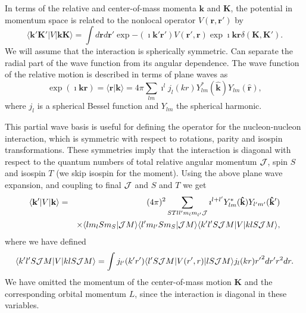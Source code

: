 \documentclass[graybox,sectrefs,envcountresetchap,open=right]{svmonodo}
\begin{document}
In terms of the relative and center-of-mass momenta $\mathbf{k}$ and
$\mathbf{K}$, the potential in momentum space is related to the nonlocal operator
$V(\mathbf{r},\mathbf{r}')$ by
\[
\langle\mathbf{k'K'}\vert V \vert \mathbf{kK}\rangle =\int d\mathbf{r}d \mathbf{r'}
        \exp{-(\imath \mathbf{k'r'})}V(\mathbf{r'},\mathbf{r})\exp{\imath \mathbf{kr}}\delta(\mathbf{K},\mathbf{K'}).
\]
We will assume that the interaction is spherically symmetric.
Can separate the radial part of the wave function from its
angular dependence. The wave function of the relative motion is described
in terms of plane waves as
\[
\exp{(\imath \mathbf{kr})} =\langle\mathbf{r}\vert\mathbf{k}\rangle= 4\pi\sum_{lm}\imath^{l}j_{l}(kr)Y_{lm}^{*}(\mathbf{\hat{k}})Y_{lm}(\mathbf{\hat{r}}),
\]
where $j_l$ is a spherical Bessel function and $Y_{lm}$ the
spherical harmonic.

\noindent
This partial wave basis is useful for defining the operator for
the nucleon-nucleon interaction, which
is symmetric with respect to rotations, parity and
isospin transformations. These symmetries imply that the interaction is
diagonal with respect to the quantum numbers of total relative angular
momentum ${\cal J}$, spin $S$ and isospin $T$ (we skip isospin for the moment). Using the above plane wave expansion,
and coupling to final ${\cal J}$ and $S$ and $T$ we get
\begin{eqnarray*}
 \langle\mathbf{k'}\vert V \vert\mathbf{k}\rangle & = & (4\pi)^2 \sum_{STll'm_lm_{l'}{\cal J}}\imath^{l+l'} Y_{lm}^{*}(\mathbf{\hat{k}}) Y_{l'm'}(\mathbf{\hat{k}'})\\ & ~ &
\times \langle lm_lSm_S|{\cal J}M\rangle \langle l'm_{l'}Sm_S|{\cal J}M\rangle\langle k'l'S{\cal J}M\vert V \vert klS{\cal J}M\rangle,
\end{eqnarray*}
where we have defined
\[
    \langle k'l'S{\cal J}M\vert V \vert klS{\cal J}M\rangle=\int j_{l'}(k'r')\langle l'S{\cal J}M\vert V(r',r)\vert lS{\cal J}M\rangle j_l(kr) {r'}^2 dr' r^2 dr.
\]
We have omitted the momentum of the center-of-mass motion $\mathbf{K}$ and the 
corresponding orbital momentum $L$, since the interaction is diagonal
in these variables.
\end{document}
